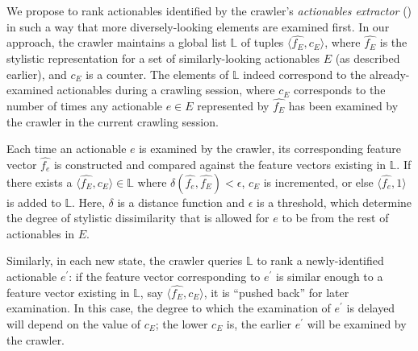 We propose to rank actionables identified by the 
crawler's \textit{actionables extractor} () 
in such a way that more diversely-looking elements are examined first.
In our approach,
the crawler maintains a global list $\mathbb{L}$ of tuples $\langle \hat{f_E}, c_E \rangle$, 
where $\hat{f_E}$ is the stylistic representation for a set of similarly-looking actionables $E$
(as described earlier),
and $c_E$ is a counter.
The elements of $\mathbb{L}$ indeed correspond to the already-examined actionables during a crawling session,
where $c_E$ corresponds to the number of times any actionable $e \in E$ represented by $\hat{f_E}$
has been examined by the crawler in the current crawling session.

Each time an actionable $e$ is examined by the crawler,
its corresponding feature vector $\hat{f_{e}}$ is constructed
and compared against the feature vectors existing in $\mathbb{L}$.
If there exists a $\langle \hat{f_E}, c_E \rangle \in \mathbb{L}$ where 
$\delta(\hat{f_{e}}, \hat{f_E}) < \epsilon$,
$c_E$ is incremented,
or else $\langle \hat{f_{e}}, 1 \rangle$ is added to $\mathbb{L}$.
Here, $\delta$ is a distance function 
and $\epsilon$ is a threshold,
which determine the degree of stylistic dissimilarity that is allowed 
for $e$ to be from the rest of actionables in $E$.

Similarly, in each new state,
the crawler queries $\mathbb{L}$ to rank a newly-identified actionable $e^{\prime}$:
if the feature vector corresponding to $e^{\prime}$ is similar enough
to a feature vector existing in $\mathbb{L}$,
say $\langle \hat{f_E}, c_E \rangle$,
it is ``pushed back'' for later examination.
In this case, the degree to which the examination of $e^{\prime}$ is delayed will depend on the value of $c_E$;
the lower $c_E$ is, the earlier $e^\prime$ will be examined by the crawler.











